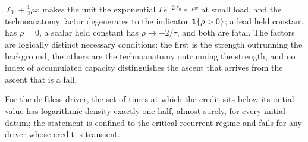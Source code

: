 \begin{theorem}
$\ell_0+\tfrac12\rho x$ makes the unit the exponential
$\Gamma e^{-2\ell_0}e^{-\rho x}$ at small load, and the technoanatomy
factor degenerates to the indicator $\mathbf{1}\{\rho>0\}$; a lead held
constant has $\rho=0$, a scalar held constant has
$\rho\to-2/\bar\tau$, and both are fatal. The factors are logically distinct
necessary conditions: the first is the strength outrunning the
background, the others are the technoanatomy outrunning the strength, and
no index of accumulated capacity distinguishes the ascent that arrives
from the ascent that is a fall.
\end{theorem}

\begin{theorem}\label{imp:half}
For the driftless driver, the set of times at which the credit sits below
its initial value has logarithmic density exactly one half, almost
surely, for every initial datum; the statement is confined to the
critical recurrent regime and fails for any driver whose credit is
transient.
\end{theorem}


